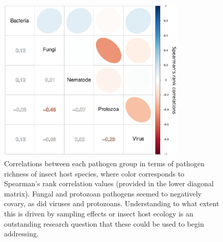 \documentclass[12pt]{article}
\begin{document}
\begin{figure}[h!]
  \begin{center}
    \includegraphics[width=0.8\textwidth]{Figures/corPlot.pdf}
    \caption{Correlations between each pathogen group in terms of pathogen richness of insect host species, where color corresponds to Spearman's rank correlation values (provided in the lower diagonal matrix). Fungal and protozoan pathogens seemed to negatively covary, as did viruses and protozoans. Understanding to what extent this is driven by sampling effects or insect host ecology is an outstanding research question that these could be used to begin addressing.}
    \label{fig:corPlot}
  \end{center}
\end{figure}
\end{document}
